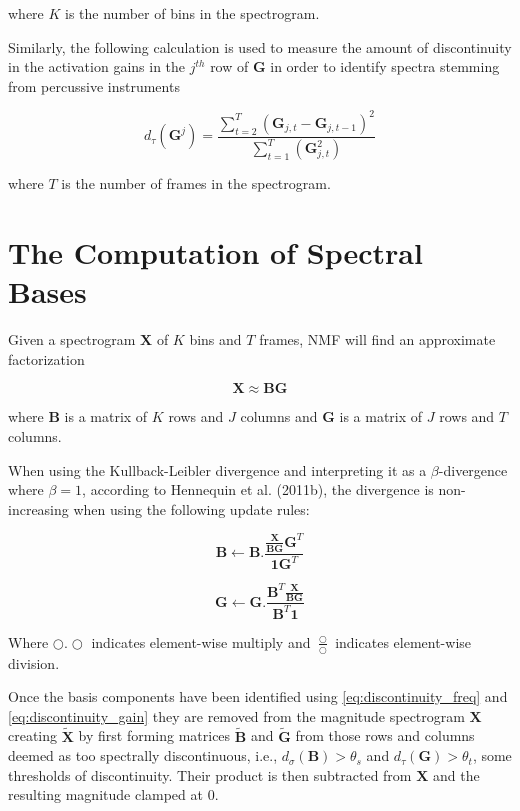 \documentclass[72pt]{article}
\begin{document}
\begin{Huge}
where \( K \) is the number of bins in the spectrogram.

\newpage

Similarly, the following calculation is used to measure the amount of
discontinuity in the activation gains in the \( j^{th} \) row of \(
\mathbf{G} \) in order to identify spectra stemming from percussive instruments

\begin{equation} \label{eq:discontinuity_gain}
d_\tau(\mathbf{G}^j) =
\frac{\sum\limits_{t=2}^{T}(\mathbf{G}_{j,t}-\mathbf{G}_{j,t-1})^2}{
    \sum\limits_{t=1}^{T}(\mathbf{G}_{j,t}^{2})}
\end{equation}

where \( T \) is the number of frames in the spectrogram.

\newpage

\section*{The Computation of Spectral Bases}
Given a spectrogram \( \mathbf{X} \) of \( K \) bins and \( T \) frames, NMF
will find an approximate factorization

\[ \mathbf{X} \approx \mathbf{B}\mathbf{G} \]

where \( \mathbf{B} \) is a matrix of \( K \) rows and \( J \) columns and \(
\mathbf{G} \) is a matrix of \( J \) rows and \( T \) columns.

\newpage

When using the Kullback-Leibler divergence and interpreting it as a
\(\beta\)-divergence where \(\beta = 1 \), according to Hennequin et al.
(2011b), the divergence is non-increasing when using the following update rules:

\[ \mathbf{B} \gets
\mathbf{B}.\frac{\frac{\mathbf{X}}{\mathbf{B}\mathbf{G}}\mathbf{G}^T}
    {\mathbf{1}\mathbf{G}^T}
\]

\[ \mathbf{G} \gets
\mathbf{G}.\frac{\mathbf{B}^T\frac{\mathbf{X}}{\mathbf{B}\mathbf{G}}}
    {\mathbf{B}^{T}\mathbf{1}}
\]

Where \( \bigcirc.\bigcirc \) indicates element-wise multiply and \( \frac{\bigcirc}{\bigcirc} \) indicates
element-wise division.

\newpage

Once the basis components have been identified using
\eqref{eq:discontinuity_freq} and \eqref{eq:discontinuity_gain} they are removed
from the magnitude spectrogram \( \mathbf{X} \) creating \( \tilde{\mathbf{X}} \) by
first forming matrices \( \tilde{\mathbf{B}} \) and \( \tilde{\mathbf{G}} \) from those rows and
columns deemed as too spectrally discontinuous, i.e., \( d_\sigma(\mathbf{B}) >
\theta_s \) and \( d_\tau(\mathbf{G}) > \theta_t \), some thresholds of
discontinuity. Their product is then subtracted from \( \mathbf{X} \) and the
resulting magnitude clamped at 0.


\end{Huge}
\end{document}
